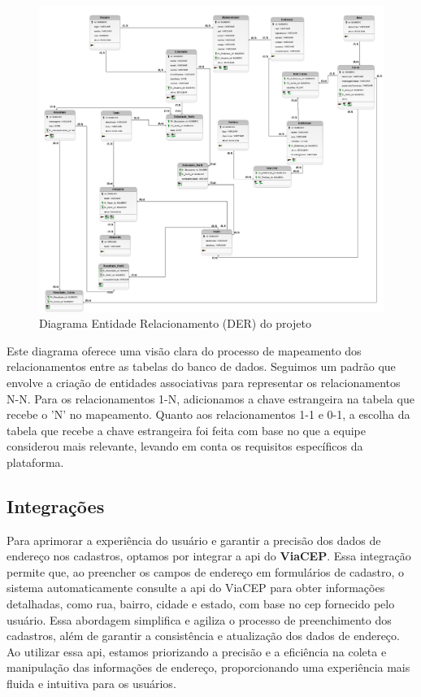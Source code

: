 \begin{figure}[ht]
        \centering
        \includegraphics[width=1.0\textwidth]{images/der.png}
        \caption{Diagrama Entidade Relacionamento (DER) do projeto}
        \label{der}
    \end{figure}
    
Este diagrama oferece uma visão clara do processo de mapeamento dos relacionamentos entre as tabelas do banco de dados. Seguimos um padrão que envolve a criação de entidades associativas para representar os relacionamentos N-N. Para os relacionamentos 1-N, adicionamos a chave estrangeira na tabela que recebe o 'N' no mapeamento. Quanto aos relacionamentos 1-1 e 0-1, a escolha da tabela que recebe a chave estrangeira foi feita com base no que a equipe considerou mais relevante, levando em conta os requisitos específicos da plataforma.

\subsection{Integrações}
Para aprimorar a experiência do usuário e garantir a precisão dos dados de endereço nos cadastros, optamos por integrar a \ac{api} do \textbf{ViaCEP}. Essa integração permite que, ao preencher os campos de endereço em formulários de cadastro, o sistema automaticamente consulte a \ac{api} do ViaCEP para obter informações detalhadas, como rua, bairro, cidade e estado, com base no \ac{cep} fornecido pelo usuário. Essa abordagem simplifica e agiliza o processo de preenchimento dos cadastros, além de garantir a consistência e atualização dos dados de endereço. Ao utilizar essa \ac{api}, estamos priorizando a precisão e a eficiência na coleta e manipulação das informações de endereço, proporcionando uma experiência mais fluida e intuitiva para os usuários.

